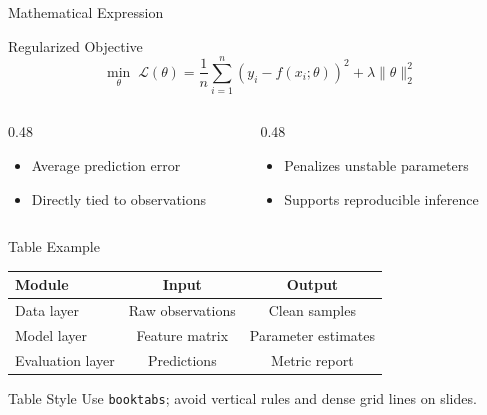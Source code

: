 \documentclass{beamer}
\begin{document}
\begin{frame}{Mathematical Expression}
    \begin{block}{Regularized Objective}
        \begin{equation*}
            \min_{\theta} \; \mathcal{L}(\theta)
            =
            \frac{1}{n}\sum_{i=1}^{n}
            \left(y_i - f(x_i;\theta)\right)^2
            + \lambda \lVert \theta \rVert_2^2
        \end{equation*}
    \end{block}
    \begin{columns}[T]
        \begin{column}{0.48\textwidth}
            \begin{itemize}
                \item Average prediction error
                \item Directly tied to observations
            \end{itemize}
        \end{column}
        \begin{column}{0.48\textwidth}
            \begin{itemize}
                \item Penalizes unstable parameters
                \item Supports reproducible inference
            \end{itemize}
        \end{column}
    \end{columns}
\end{frame}

\begin{frame}{Table Example}
    \vspace{4pt}
    \begin{center}
        \begin{tabular}{lcc}
            \toprule
            Module & Input & Output \\
            \midrule
            Data layer & Raw observations & Clean samples \\
            Model layer & Feature matrix & Parameter estimates \\
            Evaluation layer & Predictions & Metric report \\
            \bottomrule
        \end{tabular}
    \end{center}
    \vspace{8pt}
    \begin{exampleblock}{Table Style}
        Use \texttt{booktabs}; avoid vertical rules and dense grid lines on slides.
    \end{exampleblock}
\end{frame}
\end{document}
